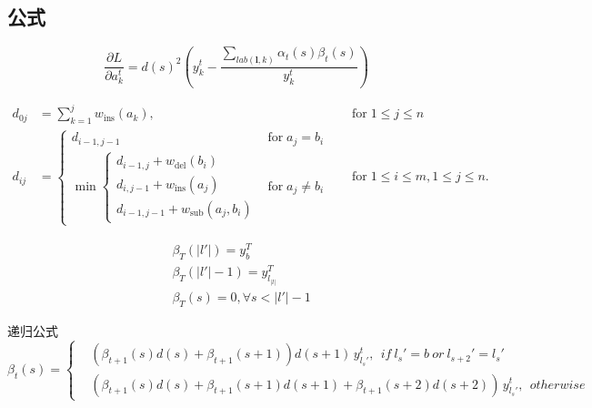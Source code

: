 \documentclass[winfonts, thesis]{njuthesis}
\begin{document}
\begin{spacing}{1.625}
\newpage %


\section{公式}

\begin{equation}
\frac{\partial L}{\partial a_{k}^t} = {d(s)}^2 (y_{k}^t - \frac{\sum_{lab(\mathbf{l},k)} \alpha_t(s)\beta_t(s) }{y_{k}^t} )
\end{equation}

\begin{equation}
\begin{aligned}
d_{{0j}}&=\sum _{{k=1}}^{{j}}w_{{\mathrm  {ins}}}(a_{{k}}),\quad &{\text{for}}\;1\leq j\leq n\\
d_{{ij}}&={\begin{cases}d_{{i-1,j-1}}&{\text{for}}\;a_{{j}}=b_{{i}}\\\min {\begin{cases}d_{{i-1,j}}+w_{{\mathrm  {del}}}(b_{{i}})\\d_{{i,j-1}}+w_{{\mathrm  {ins}}}(a_{{j}})\\d_{{i-1,j-1}}+w_{{\mathrm  {sub}}}(a_{{j}},b_{{i}})\end{cases}}&{\text{for}}\;a_{{j}}\neq b_{{i}}\end{cases}}\quad &{\text{for}}\;1\leq i\leq m,1\leq j\leq n.
\end{aligned}
\end{equation}

\begin{equation}
\begin{aligned}
&\beta_T(|l{}'|)=y_{b}^{T}\\
&\beta_T(|l{}'|-1)=y_{l_|l|}^{T} \\
&\beta_T(s)=0, \forall s < |l{}'|-1
\end{aligned}
\end{equation}

递归公式
\begin{equation}
\beta_t(s)=\left\{
\begin{aligned}
& (\beta_{t+1}(s) d(s)+\beta_{t+1}(s+1))d(s+1)\,  y_{l_s{}'}^t, \: \: if \:  l_s{}'=b \:  or \:  l_{s+2}{}'=l_s{}'\\
& (\beta_{t+1}(s) d(s)+\beta_{t+1}(s+1)d(s+1)+\beta_{t+1}(s+2)d(s+2))\,  y_{l_s{}'}^t,\: \:   otherwise
\end{aligned}
\right.
\end{equation}


\end{spacing}
\end{document}
